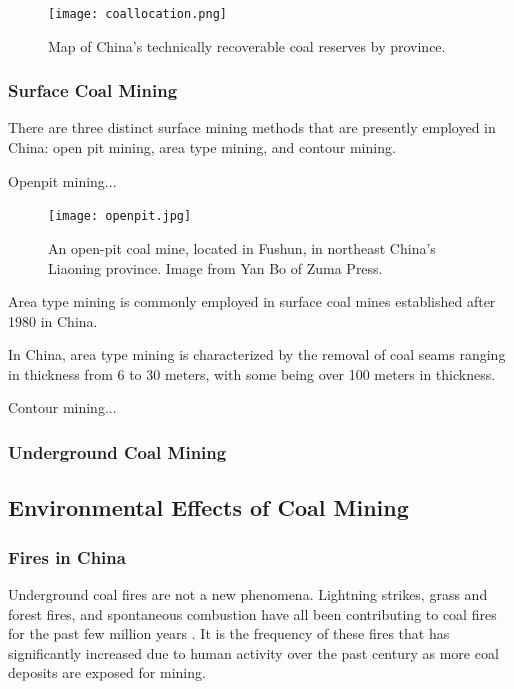 \begin{figure}[ht]
\centering
    \texttt{[image: coallocation.png]}
    \caption{Map of China's technically recoverable coal reserves by province. }
    \label{fig:coallocation}
\end{figure}

\subsubsection{Surface Coal Mining}

There are three distinct surface mining methods that are presently employed in China: open pit mining, area type mining, and contour mining. 

Openpit mining... 


\begin{figure}[ht]
\centering
    \texttt{[image: openpit.jpg]}
    \caption{An open-pit coal mine, located in Fushun, in northeast China's Liaoning province. Image from Yan Bo of Zuma Press. }
    \label{fig:openpit}
\end{figure}

Area type mining is commonly employed in surface coal mines established after 1980 in China. 

In China, area type mining is characterized by the removal of coal seams ranging in thickness from 6 to 30 meters, with some being over 100 meters in thickness. 

Contour mining...



\citep{ji2012surface}


\subsubsection{Underground Coal Mining}


\subsection{Environmental Effects of Coal Mining}

\subsubsection{Fires in China}

Underground coal fires are not a new phenomena. Lightning strikes, grass and forest fires, and spontaneous combustion have all been contributing to coal fires for the past few million years \citep{ceycoal}. It is the frequency of these fires that has significantly increased due to human activity over the past century as more coal deposits are exposed for mining. 

